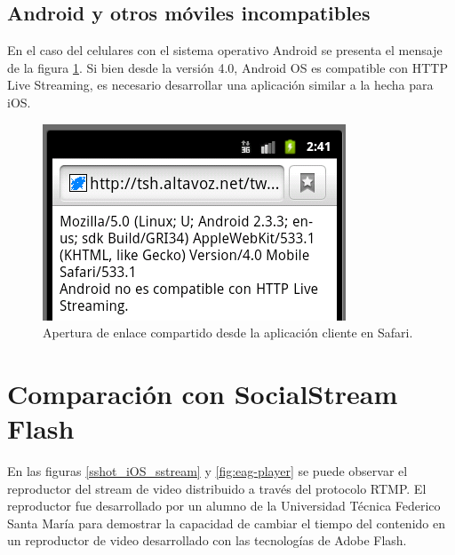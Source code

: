   \subsection{Android y otros móviles incompatibles}
  En el caso del celulares con el sistema operativo Android se presenta el mensaje de la figura \ref{fig:uagent-android}. Si bien desde la versión 4.0, Android OS es compatible con HTTP Live Streaming, es necesario desarrollar una aplicación similar a la hecha para iOS.
 \begin{figure}[H]
	\centering
	\includegraphics[scale=0.7]{imgs/uagent-android.png} 
	\caption{Apertura de enlace compartido desde la aplicación cliente en Safari.}
	\label{fig:uagent-android}
 \end{figure}  


\section{Comparación con SocialStream Flash}

En las figuras \ref{sshot_iOS_sstream} y \ref{fig:eag-player} se puede observar el reproductor del stream de video distribuido a través del protocolo RTMP. El reproductor fue desarrollado por un alumno de la Universidad Técnica Federico Santa María para demostrar la capacidad de cambiar el tiempo del contenido en un reproductor de video desarrollado con las tecnologías de Adobe Flash.

